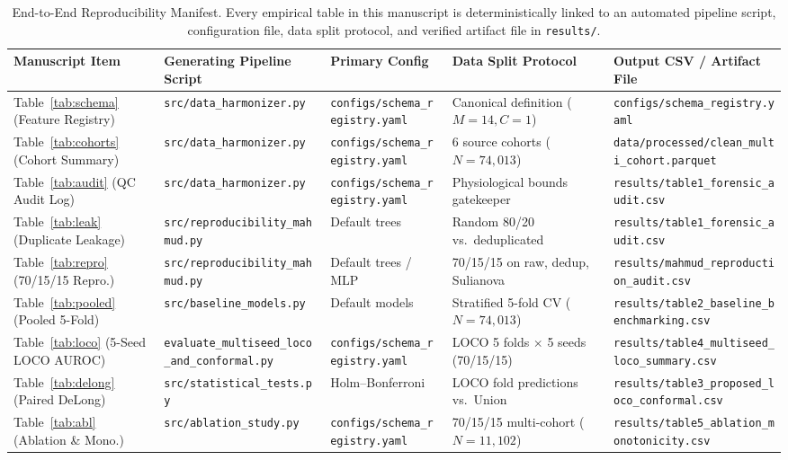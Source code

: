 \documentclass[journal]{IEEEtran}
\begin{document}
\begin{table}[t]
\caption{End-to-End Reproducibility Manifest. Every empirical table in this manuscript is deterministically linked to an automated pipeline script, configuration file, data split protocol, and verified artifact file in \texttt{results/}.}
\label{tab:manifest}
\centering\footnotesize
\setlength{\tabcolsep}{3.8pt}
\begin{tabular}{lllll}
\toprule
Manuscript Item & Generating Pipeline Script & Primary Config & Data Split Protocol & Output CSV / Artifact File\\
\midrule
Table~\ref{tab:schema} (Feature Registry) & \texttt{src/data\_harmonizer.py} & \texttt{configs/schema\_registry.yaml} & Canonical definition ($M{=}14, C{=}1$) & \texttt{configs/schema\_registry.yaml}\\
Table~\ref{tab:cohorts} (Cohort Summary) & \texttt{src/data\_harmonizer.py} & \texttt{configs/schema\_registry.yaml} & 6 source cohorts ($N=74{,}013$) & \texttt{data/processed/clean\_multi\_cohort.parquet}\\
Table~\ref{tab:audit} (QC Audit Log) & \texttt{src/data\_harmonizer.py} & \texttt{configs/schema\_registry.yaml} & Physiological bounds gatekeeper & \texttt{results/table1\_forensic\_audit.csv}\\
Table~\ref{tab:leak} (Duplicate Leakage) & \texttt{src/reproducibility\_mahmud.py} & Default trees & Random 80/20 vs.\ deduplicated & \texttt{results/table1\_forensic\_audit.csv}\\
Table~\ref{tab:repro} (70/15/15 Repro.) & \texttt{src/reproducibility\_mahmud.py} & Default trees / MLP & 70/15/15 on raw, dedup, Sulianova & \texttt{results/mahmud\_reproduction\_audit.csv}\\
Table~\ref{tab:pooled} (Pooled 5-Fold) & \texttt{src/baseline\_models.py} & Default models & Stratified 5-fold CV ($N=74{,}013$) & \texttt{results/table2\_baseline\_benchmarking.csv}\\
Table~\ref{tab:loco} (5-Seed LOCO AUROC) & \texttt{evaluate\_multiseed\_loco\_and\_conformal.py} & \texttt{configs/schema\_registry.yaml} & LOCO 5 folds $\times$ 5 seeds (70/15/15) & \texttt{results/table4\_multiseed\_loco\_summary.csv}\\
Table~\ref{tab:delong} (Paired DeLong) & \texttt{src/statistical\_tests.py} & Holm--Bonferroni & LOCO fold predictions vs.\ Union & \texttt{results/table3\_proposed\_loco\_conformal.csv}\\
Table~\ref{tab:abl} (Ablation \& Mono.) & \texttt{src/ablation\_study.py} & \texttt{configs/schema\_registry.yaml} & 70/15/15 multi-cohort ($N=11{,}102$) & \texttt{results/table5\_ablation\_monotonicity.csv}\\

\end{tabular}
\end{table}
\end{document}
